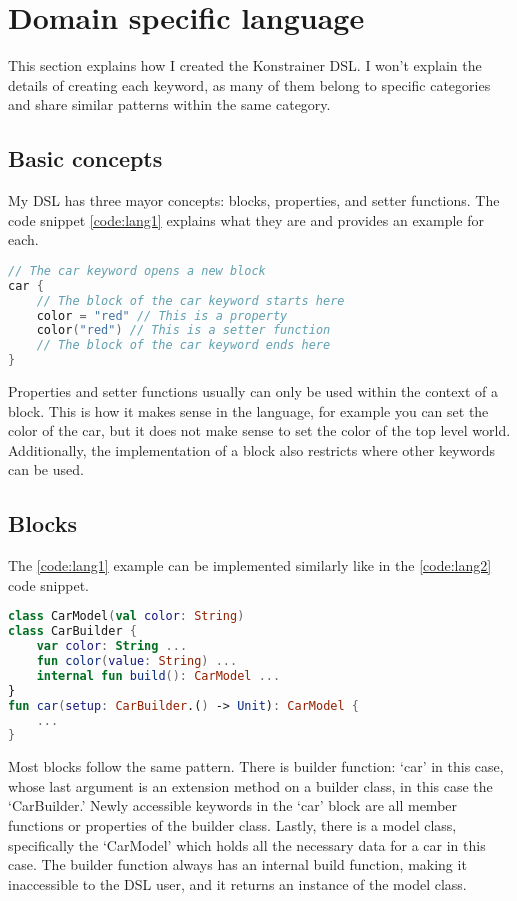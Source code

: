 \section{Domain specific language}
\label{sec:dsl}

This section explains how I created the Konstrainer DSL. I won't explain the details of creating each keyword, as many of them belong to specific categories and share similar patterns within the same category.

\subsection{Basic concepts}

My DSL has three mayor concepts: blocks, properties, and setter functions. The code snippet \ref{code:lang1} explains what they are and provides an example for each.

\begin{lstlisting}[caption={Language concepts},language=Kotlin,label=code:lang1]
// The car keyword opens a new block
car { 
    // The block of the car keyword starts here
    color = "red" // This is a property
    color("red") // This is a setter function
    // The block of the car keyword ends here
}
\end{lstlisting}

Properties and setter functions usually can only be used within the context of a block. This is how it makes sense in the language, for example you can set the color of the car, but it does not make sense to set the color of the top level world. Additionally, the implementation of a block also restricts where other keywords can be used.

\subsection{Blocks}
 
The \ref{code:lang1} example can be implemented similarly like in the \ref{code:lang2} code snippet.

\begin{lstlisting}[caption={Basic idea behind a block},language=Kotlin,label=code:lang2]
class CarModel(val color: String)
class CarBuilder {
    var color: String ...
    fun color(value: String) ...
    internal fun build(): CarModel ...
}
fun car(setup: CarBuilder.() -> Unit): CarModel {
    ...
}
\end{lstlisting}

Most blocks follow the same pattern. There is builder function: `car' in this case, whose last argument is an extension method on a builder class, in this case the `CarBuilder.' Newly accessible keywords in the `car' block are all member functions or properties of the builder class. Lastly, there is a model class, specifically the `CarModel' which holds all the necessary data for a car in this case. The builder function always has an internal build function, making it inaccessible to the DSL user, and it returns an instance of the model class.

